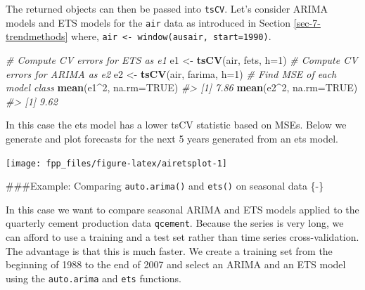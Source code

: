 \documentclass[]{book}
\newenvironment{Shaded}{\begin{snugshade}}{\end{snugshade}}
\newcommand{\CommentTok}[1]{\textcolor[rgb]{0.56,0.35,0.01}{\textit{#1}}}
\newcommand{\DataTypeTok}[1]{\textcolor[rgb]{0.13,0.29,0.53}{#1}}
\newcommand{\DecValTok}[1]{\textcolor[rgb]{0.00,0.00,0.81}{#1}}
\newcommand{\KeywordTok}[1]{\textcolor[rgb]{0.13,0.29,0.53}{\textbf{#1}}}
\newcommand{\NormalTok}[1]{#1}
\newcommand{\OperatorTok}[1]{\textcolor[rgb]{0.81,0.36,0.00}{\textbf{#1}}}
\newcommand{\OtherTok}[1]{\textcolor[rgb]{0.56,0.35,0.01}{#1}}
\newcommand{\StringTok}[1]{\textcolor[rgb]{0.31,0.60,0.02}{#1}}
\begin{document}
The returned objects can then be passed into \texttt{tsCV}. Let's consider ARIMA models and ETS models for the \texttt{air} data as introduced in Section \ref{sec-7-trendmethods} where, \texttt{air\ \textless{}-\ window(ausair,\ start=1990)}.

\begin{Shaded}
\begin{Highlighting}[]
\CommentTok{# Compute CV errors for ETS as e1}
\NormalTok{e1 <-}\StringTok{ }\KeywordTok{tsCV}\NormalTok{(air, fets, }\DataTypeTok{h=}\DecValTok{1}\NormalTok{)}
\CommentTok{# Compute CV errors for ARIMA as e2}
\NormalTok{e2 <-}\StringTok{ }\KeywordTok{tsCV}\NormalTok{(air, farima, }\DataTypeTok{h=}\DecValTok{1}\NormalTok{)}
\CommentTok{# Find MSE of each model class}
\KeywordTok{mean}\NormalTok{(e1}\OperatorTok{^}\DecValTok{2}\NormalTok{, }\DataTypeTok{na.rm=}\OtherTok{TRUE}\NormalTok{)}
\CommentTok{#> [1] 7.86}
\KeywordTok{mean}\NormalTok{(e2}\OperatorTok{^}\DecValTok{2}\NormalTok{, }\DataTypeTok{na.rm=}\OtherTok{TRUE}\NormalTok{)}
\CommentTok{#> [1] 9.62}
\end{Highlighting}
\end{Shaded}

In this case the ets model has a lower tsCV statistic based on MSEs. Below we generate and plot forecasts for the next 5 years generated from an ets model.

\begin{Shaded}
\end{Shaded}

\begin{center}\texttt{[image: fpp\_files/figure-latex/airetsplot-1]} \end{center}

\#\#\#Example: Comparing \texttt{auto.arima()} and \texttt{ets()} on seasonal data \{-\}

In this case we want to compare seasonal ARIMA and ETS models applied to the quarterly cement production data \texttt{qcement}. Because the series is very long, we can afford to use a training and a test set rather than time series cross-validation. The advantage is that this is much faster. We create a training set from the beginning of 1988 to the end of 2007 and select an ARIMA and an ETS model using the \texttt{auto.arima} and \texttt{ets} functions.
\end{document}
